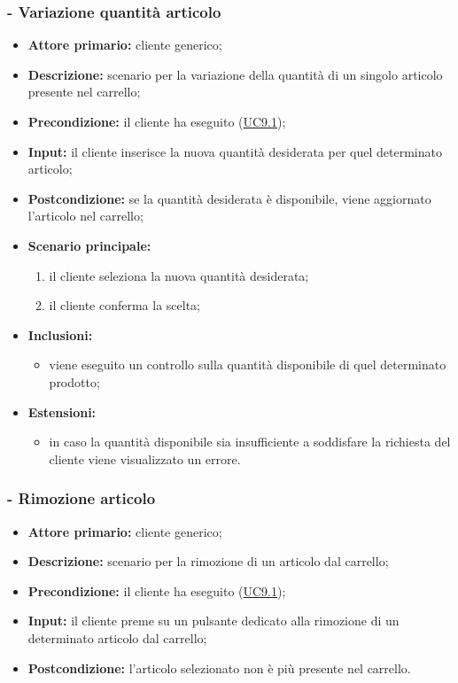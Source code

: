 \subsubsection{ - Variazione quantità articolo}
\begin{itemize}
    \item \textbf{Attore primario:} cliente generico;
    \item \textbf{Descrizione:} scenario per la variazione della quantità di un singolo articolo presente nel carrello;
    \item \textbf{Precondizione:} il cliente ha eseguito (\hyperref[UC9.1]{UC9.1});
    \item \textbf{Input:} il cliente inserisce la nuova quantità desiderata per quel determinato articolo;
    \item \textbf{Postcondizione:} se la quantità desiderata è disponibile, viene aggiornato l'articolo nel carrello;
    \item \textbf{Scenario principale:}
          \begin{enumerate}
              \item il cliente seleziona la nuova quantità desiderata;
              \item il cliente conferma la scelta;
          \end{enumerate}
    \item \textbf{Inclusioni:}
          \begin{itemize}
              \item viene eseguito un controllo sulla quantità disponibile di quel determinato prodotto;
          \end{itemize}
    \item \textbf{Estensioni:}
          \begin{itemize}
              \item in caso la quantità disponibile sia insufficiente a soddisfare la richiesta del cliente viene visualizzato un errore.
          \end{itemize}
\end{itemize}

\stepsubUserCase
\subsubsection{ - Rimozione articolo}
\begin{itemize}
    \item \textbf{Attore primario:} cliente generico;
    \item \textbf{Descrizione:} scenario per la rimozione di un articolo dal carrello;
    \item \textbf{Precondizione:} il cliente ha eseguito (\hyperref[UC9.1]{UC9.1});
    \item \textbf{Input:} il cliente preme su un pulsante dedicato alla rimozione di un determinato articolo dal carrello;
    \item \textbf{Postcondizione:} l'articolo selezionato non è più presente nel carrello.
\end{itemize}

